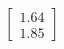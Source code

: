 \documentclass[preview]{standalone}
\begin{document}
\begin{align*}
\begin{bmatrix} 1.64 \\ 1.85 \end{bmatrix}
\end{align*}
\end{document}
